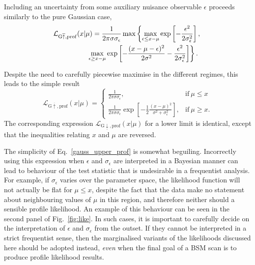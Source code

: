 \documentclass[pdftex,twocolumn,epjc3_preprint,runningheads]{svjour3}
\renewcommand{\_}{\discretionary{\underscore}{}{\underscore}}
\begin{document}
Including an uncertainty from some auxiliary nuisance observable $\epsilon$ proceeds similarly to the pure Gaussian case,
\begin{align}
&\mathcal{L}_{\mathrm{G}\overline{\uparrow},\mathrm{prof}}(x|\mu) = \frac{1}{2\pi\sigma\sigma_\epsilon} \max\left\{\max_{\epsilon\le x-\mu} \exp\left[-\frac{\epsilon^2}{2\sigma_\epsilon^2}\right],\right. \nonumber\\
&\hspace{1.7cm}\left.\max_{\epsilon\ge x-\mu} \exp\left[-\frac{(x-\mu-\epsilon)^2}{2\sigma^2} - \frac{\epsilon^2}{2\sigma_\epsilon^2}\right] \right\}.
\end{align}

Despite the need to carefully piecewise maximise in the different regimes, this leads to the simple result
\begin{equation}
\label{gauss_upper_prof}
\mathcal{L}_{\mathrm{G}\overline{\uparrow},\mathrm{prof}}(x|\mu)=\begin{cases}
\frac{1}{2\pi\sigma\sigma_\epsilon}, & \mathrm{if}\ \mu \le x\\
\frac{1}{2\pi\sigma\sigma_\epsilon} \exp\left[-\frac12\frac{(x-\mu)^2}{\sigma^2 + \sigma_\epsilon^2}\right], & \mathrm{if}\ \mu \ge x.
\end{cases}
\end{equation}
The corresponding expression $\mathcal{L}_{\mathrm{G}\underline{\downarrow},\mathrm{prof}}(x|\mu)$ for a lower limit is identical, except that the inequalities relating $x$ and $\mu$ are reversed.

The simplicity of Eq.\ \ref{gauss_upper_prof} is somewhat beguiling. Incorrectly using this expression when $\epsilon$ and $\sigma_\epsilon$ are interpreted in a Bayesian manner can lead to behaviour of the test statistic that is undesirable in a frequentist analysis.  For example, if $\sigma_\epsilon$ varies over the parameter space, the likelihood function will not actually be flat for $\mu\le x$, despite the fact that the data make no statement about neighbouring values of $\mu$ in this region, and therefore neither should a sensible profile likelihood.  An example of this behaviour can be seen in the second panel of Fig.\ \ref{fig:like}.  In such cases, it is important to carefully decide on the interpretation of $\epsilon$ and $\sigma_\epsilon$ from the outset.  If they cannot be interpreted in a strict frequentist sense, then the marginalised variants of the likelihoods discussed here should be adopted instead, \textit{even} when the final goal of a BSM scan is to produce profile likelihood results.
\end{document}
